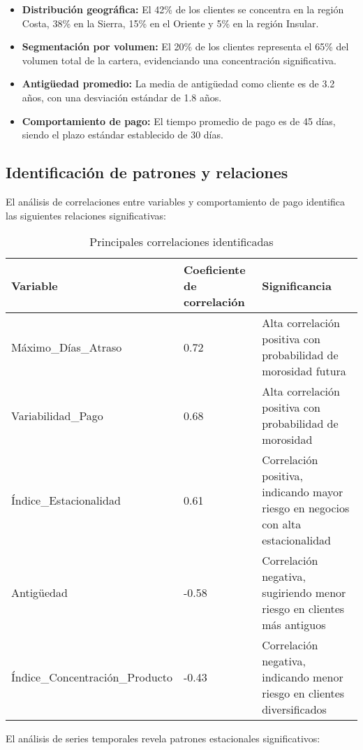 \begin{itemize}
    \item \textbf{Distribución geográfica:} El 42\% de los clientes se concentra en la región Costa, 38\% en la Sierra, 15\% en el Oriente y 5\% en la región Insular.
    
    \item \textbf{Segmentación por volumen:} El 20\% de los clientes representa el 65\% del volumen total de la cartera, evidenciando una concentración significativa.
    
    \item \textbf{Antigüedad promedio:} La media de antigüedad como cliente es de 3.2 años, con una desviación estándar de 1.8 años.
    
    \item \textbf{Comportamiento de pago:} El tiempo promedio de pago es de 45 días, siendo el plazo estándar establecido de 30 días.
\end{itemize}

\subsection{Identificación de patrones y relaciones}
El análisis de correlaciones entre variables y comportamiento de pago identifica las siguientes relaciones significativas:

\begin{table}[ht]
\centering
\begin{tabular}{|p{6cm}|p{3cm}|p{6cm}|}
\hline
\textbf{Variable} & \textbf{Coeficiente de correlación} & \textbf{Significancia} \\
\hline
Máximo\_Días\_Atraso & 0.72 & Alta correlación positiva con probabilidad de morosidad futura \\
\hline
Variabilidad\_Pago & 0.68 & Alta correlación positiva con probabilidad de morosidad \\
\hline
Índice\_Estacionalidad & 0.61 & Correlación positiva, indicando mayor riesgo en negocios con alta estacionalidad \\
\hline
Antigüedad & -0.58 & Correlación negativa, sugiriendo menor riesgo en clientes más antiguos \\
\hline
Índice\_Concentración\_Producto & -0.43 & Correlación negativa, indicando menor riesgo en clientes diversificados \\
\hline
\end{tabular}
\caption{Principales correlaciones identificadas}
\end{table}
\newpage
El análisis de series temporales revela patrones estacionales significativos:

